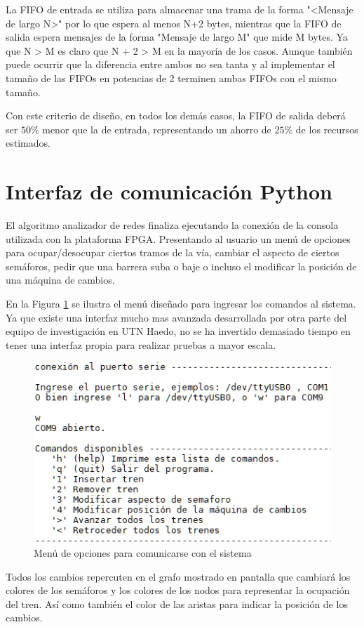 		La FIFO de entrada se utiliza para almacenar una trama de la forma "<Mensaje de largo N>" por lo que espera al menos N+2 bytes, mientras que la FIFO de salida espera mensajes de la forma "Mensaje de largo M" que mide M bytes. Ya que N > M es claro que N + 2 > M en la mayoría de los casos. Aunque también puede ocurrir que la diferencia entre ambos no sea tanta y al implementar el tamaño de las FIFOs en potencias de 2 terminen ambas FIFOs con el mismo tamaño. 

		Con este criterio de diseño, en todos los demás casos, la FIFO de salida deberá ser $50\%$ menor que la de entrada, representando un ahorro de $25\%$ de los recursos estimados.
		
\section{Interfaz de comunicación Python}

	El algoritmo analizador de redes finaliza ejecutando la conexión de la consola utilizada con la plataforma FPGA. Presentando al usuario un menú de opciones para ocupar/desocupar ciertos tramos de la vía, cambiar el aspecto de ciertos semáforos, pedir que una barrera suba o baje o incluso el modificar la posición de una máquina de cambios.
	
	En la Figura \ref{fig:Menu_UART} se ilustra el menú diseñado para ingresar los comandos al sistema. Ya que existe una interfaz mucho mas avanzada desarrollada por otra parte del equipo de investigación en UTN Haedo, no se ha invertido demasiado tiempo en tener una interfaz propia para realizar pruebas a mayor escala.
	
		\begin{figure}[h]
		\centering
		\includegraphics[scale=.76]{./Figures/Test/UART_2}
			\caption{Menú de opciones para comunicarse con el sistema}
			\label{fig:Menu_UART}
		\end{figure}
	
	\vspace{5cm}
	
	Todos los cambios repercuten en el grafo mostrado en pantalla que cambiará los colores de los semáforos y los colores de los nodos para representar la ocupación del tren. Así como también el color de las aristas para indicar la posición de los cambios.
